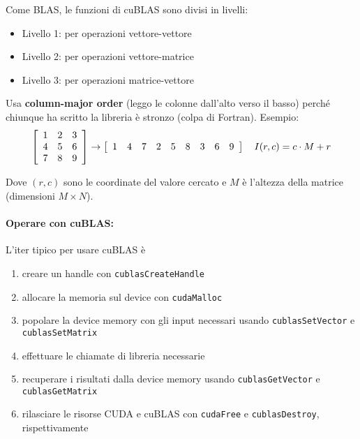 Come BLAS, le funzioni di cuBLAS sono divisi in livelli: 
\begin{itemize}
	\item Livello 1: per operazioni vettore-vettore
	
	\item Livello 2: per operazioni vettore-matrice
	
	\item Livello 3: per operazioni matrice-vettore
\end{itemize}

Usa \textbf{column-major order} (leggo le colonne dall'alto verso il basso) perché chiunque ha scritto la libreria è stronzo (colpa di Fortran). Esempio: 
$$
\left[
\begin{array}{c c c}
	1 & 2 & 3 \\
	4 & 5 & 6 \\
	7 & 8 & 9
\end{array}
\right]
\rightarrow \left[\begin{array}{c c c c c c c c c}
	1 & 4 & 7 & 2 & 5 & 8 & 3 & 6  & 9
\end{array}\right]
\quad I(r,c) = c \cdot M  + r 
$$

Dove $(r,c)$ sono le coordinate del valore cercato e $M$ è l'altezza della matrice (dimensioni $M \times N$).

\paragraph{Operare con cuBLAS:} L'iter tipico per usare cuBLAS è
\begin{enumerate}
	\item creare un handle con \texttt{cublasCreateHandle}
	
	\item allocare la memoria sul device con \texttt{cudaMalloc}
	
	\item popolare la device memory con gli input necessari usando \texttt{cublasSetVector} e \texttt{cublasSetMatrix}
	
	\item effettuare le chiamate di libreria necessarie
	
	\item recuperare i risultati dalla device memory usando \texttt{cublasGetVector} e \texttt{cublasGetMatrix}
	
	\item rilasciare le risorse CUDA e cuBLAS con \texttt{cudaFree} e \texttt{cublasDestroy}, rispettivamente
\end{enumerate}

